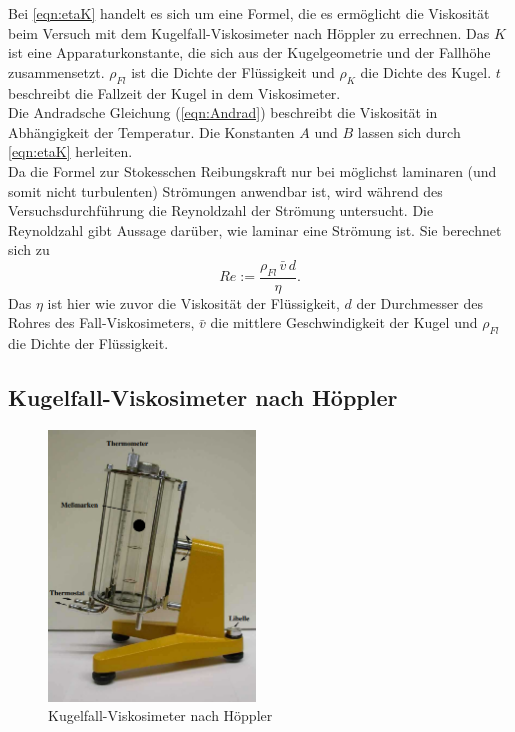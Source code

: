     Bei \autoref{eqn:etaK} handelt es sich um eine Formel, die es ermöglicht die Viskosität beim Versuch mit dem Kugelfall-Viskosimeter nach Höppler zu errechnen.
    Das $K$ ist eine Apparaturkonstante, die sich aus der Kugelgeometrie und der Fallhöhe zusammensetzt. $\rho_{Fl}$ ist die Dichte der Flüssigkeit und $\rho_K$ die Dichte
    des Kugel. $t$ beschreibt die Fallzeit der Kugel in dem Viskosimeter.\\
    Die Andradsche Gleichung (\ref{eqn:Andrad}) beschreibt die Viskosität in Abhängigkeit der Temperatur. Die Konstanten $A$ und $B$ lassen sich durch \autoref{eqn:etaK}
    herleiten.\\
    Da die Formel zur Stokesschen Reibungskraft nur bei möglichst laminaren (und somit nicht turbulenten) Strömungen anwendbar ist, wird während des Versuchsdurchführung die
    Reynoldzahl der Strömung untersucht. Die Reynoldzahl gibt Aussage darüber, wie laminar eine Strömung ist. Sie berechnet sich zu
    \begin{equation}
        \label{eqn:Reynoldzahl}
        Re := \frac{\rho_{Fl}\,\bar{v}\,d}{\eta}.
    \end{equation}
    Das $\eta$ ist hier wie zuvor die Viskosität der Flüssigkeit, $d$ der Durchmesser des Rohres des Fall-Viskosimeters, $\bar{v}$ die mittlere Geschwindigkeit der Kugel und
    $\rho_{Fl}$ die Dichte der Flüssigkeit.
\newpage
\subsection{Kugelfall-Viskosimeter nach Höppler}

\begin{figure}
    \centering
    \includegraphics[width=5.5cm]{Kugelfall.png}
    \caption{Kugelfall-Viskosimeter nach Höppler \cite{anleitung107}}
    \label{Abb:Kugelfall}
\end{figure}

